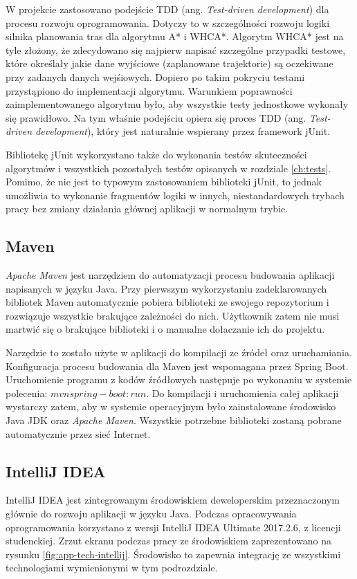 W projekcie zastosowano podejście TDD (ang. {\it Test-driven development}) dla procesu rozwoju oprogramowania. Dotyczy to w szczególności rozwoju logiki silnika planowania tras dla algorytmu A* i WHCA*. Algorytm WHCA* jest na tyle złożony, że zdecydowano się najpierw napisać szczególne przypadki testowe, które określały jakie dane wyjściowe (zaplanowane trajektorie) są oczekiwane przy zadanych danych wejśiowych. Dopiero po takim pokryciu testami przystąpiono do implementacji algorytmu. Warunkiem poprawności zaimplementowanego algorytmu było, aby wszystkie testy jednostkowe wykonały się prawidłowo. Na tym właśnie podejściu opiera się proces TDD (ang. {\it Test-driven development}), który jest naturalnie wspierany przez framework jUnit.

Bibliotekę jUnit wykorzystano także do wykonania testów skuteczności algorytmów i wszystkich pozostałych testów opisanych w rozdziale \ref{ch:tests}. Pomimo, że nie jest to typowym zastosowaniem biblioteki jUnit, to jednak umożliwia to wykonanie fragmentów logiki w innych, niestandardowych trybach pracy bez zmiany działania głównej aplikacji w normalnym trybie.

\subsection{Maven}
{\it Apache Maven} jest narzędziem do automatyzacji procesu budowania aplikacji napisanych w języku Java.
Przy pierwszym wykorzystaniu zadeklarowanych bibliotek Maven automatycznie pobiera biblioteki ze swojego repozytorium i rozwiązuje wszystkie brakujące zależności do nich. Użytkownik zatem nie musi martwić się o brakujące biblioteki i o manualne dołaczanie ich do projektu.

Narzędzie to zostało użyte w aplikacji do kompilacji ze źródeł oraz uruchamiania. Konfiguracja procesu budowania dla Maven jest wspomagana przez Spring Boot. Uruchomienie programu z kodów źródłowych następuje po wykonaniu w systemie polecenia: $mvn spring-boot:run$.
Do kompilacji i uruchomienia całej aplikacji wystarczy zatem, aby w systemie operacyjnym było zainstalowane środowisko Java JDK oraz {\it Apache Maven}. Wszystkie potrzebne biblioteki zostaną pobrane automatycznie przez sieć Internet.

\subsection{IntelliJ IDEA}
IntelliJ IDEA jest zintegrowanym środowiskiem deweloperskim przeznaczonym głównie do rozwoju aplikacji w języku Java.
Podczas opracowywania oprogramowania korzystano z wersji IntelliJ IDEA Ultimate 2017.2.6, z licencji studenckiej. Zrzut ekranu podczas pracy ze środowiskiem zaprezentowano na rysunku \ref{fig:app-tech-intellij}.
Środowisko to zapewnia integrację ze wszystkimi technologiami wymienionymi w tym podrozdziale.


